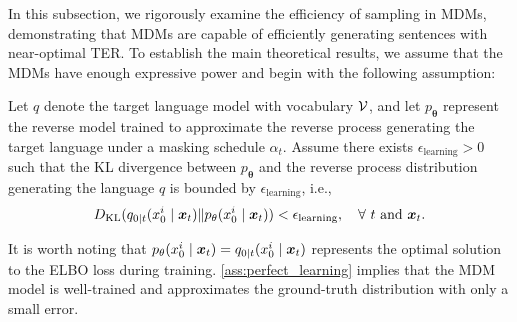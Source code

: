 In this subsection, we rigorously examine the efficiency of sampling in MDMs, demonstrating that MDMs are capable of efficiently generating sentences with near-optimal TER. To establish the main theoretical results, we assume that the MDMs have enough expressive power and begin with the following assumption:

\begin{assumption}
\label{ass:perfect_learning}
    Let $q$ denote the target language model with vocabulary ${\mathcal{V}}$, and let $p_\mathbf{\theta}$ represent the reverse model trained to approximate the reverse process generating the target language under a masking schedule $\alpha_t$. Assume there exists $\epsilon_\text{learning} > 0$ such that the KL divergence between $p_\mathbf{\theta}$ and the reverse process distribution generating the language $q$ is bounded by $\epsilon_\text{learning}$, i.e.,
    \begin{equation*}
        D_{\mathrm{KL}}(q_{0|t}(x_0^i \mid {\bm{x}}_t)\|p_\mathbf{\theta}(x_0^i \mid {\bm{x}}_t)) < \epsilon_\text{learning}, \quad \forall\ t \text{ and } {\bm{x}}_t.
    \end{equation*}
\end{assumption}

It is worth noting that $p_\mathbf{\theta}(x_0^i \mid {\bm{x}}_t) = q_{0|t}(x_0^i \mid {\bm{x}}_t)$ represents the optimal solution to the ELBO loss during training. \cref{ass:perfect_learning} implies that the MDM model is well-trained and approximates the ground-truth distribution with only a small error.

